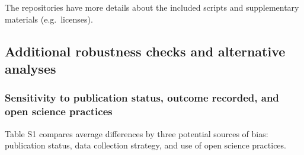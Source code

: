 \documentclass[sn-nature,referee,pdflatex]{sn-jnl}
\begin{document}
The repositories have more details about the included scripts and
supplementary materials (e.g.~licenses).

\subsection{Additional robustness checks and alternative
analyses}\label{additional-robustness-checks-and-alternative-analyses}

\subsubsection{Sensitivity to publication status, outcome recorded, and
open science
practices}\label{sensitivity-to-publication-status-outcome-recorded-and-open-science-practices}

Table S1 compares average differences by three potential sources of
bias: publication status, data collection strategy, and use of open
science practices.
\end{document}
